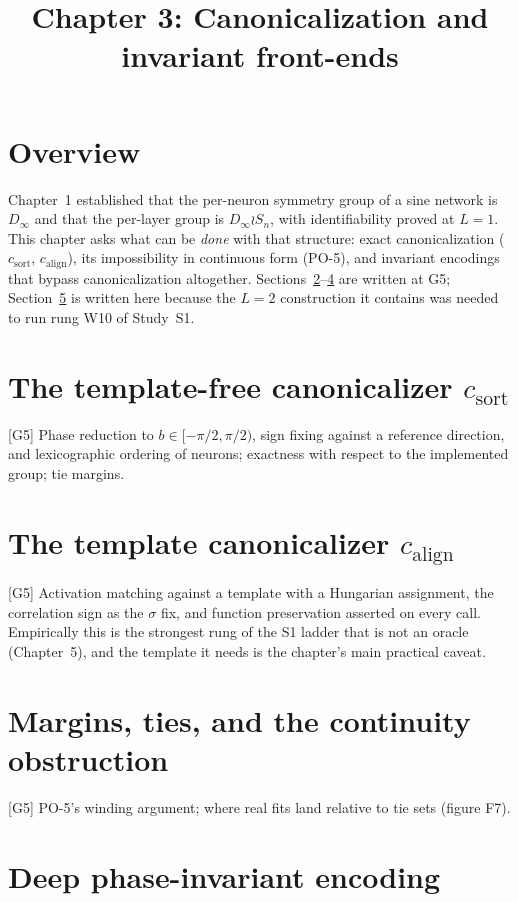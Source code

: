 \documentclass[11pt]{article}
\title{Chapter 3: Canonicalization and invariant front-ends}
\begin{document}
\maketitle

\section{Overview}
Chapter~1 established that the per-neuron symmetry group of a sine network is $D_\infty$ and that
the per-layer group is $D_\infty\wr S_n$, with identifiability proved at $L=1$. This chapter asks
what can be \emph{done} with that structure: exact canonicalization ($c_{\mathrm{sort}}$,
$c_{\mathrm{align}}$), its impossibility in continuous form (PO-5), and invariant encodings that
bypass canonicalization altogether. Sections~\ref{sec:csort}--\ref{sec:margins} are written at G5;
Section~\ref{sec:deep} is written here because the $L=2$ construction it contains was needed to
run rung W10 of Study~S1.

\section{The template-free canonicalizer $c_{\mathrm{sort}}$}
\label{sec:csort}
[G5] Phase reduction to $b\in[-\pi/2,\pi/2)$, sign fixing against a reference direction, and
lexicographic ordering of neurons; exactness with respect to the implemented group; tie margins.

\section{The template canonicalizer $c_{\mathrm{align}}$}
\label{sec:calign}
[G5] Activation matching against a template with a Hungarian assignment, the correlation sign as
the $\sigma$ fix, and function preservation asserted on every call. Empirically this is the
strongest rung of the S1 ladder that is not an oracle (Chapter~5), and the template it needs is
the chapter's main practical caveat.

\section{Margins, ties, and the continuity obstruction}
\label{sec:margins}
[G5] PO-5's winding argument; where real fits land relative to tie sets (figure F7).

\section{Deep phase-invariant encoding}
\label{sec:deep}
\end{document}
